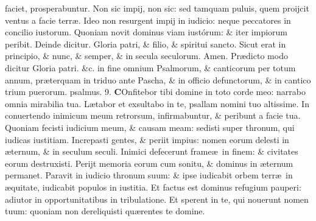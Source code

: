 \documentclass[a5paper,10pt]{book}
\def\ae{æ}
\begin{document}
\begin{multicols*}{2}
faciet, prosperabuntur.
\newline \color{red} N\color{black}on sic impij, non sic: sed tamquam puluis, quem proijcit ventus a facie terr\ae .
\newline \color{red} I\color{black}deo non resurgent impij in iudicio: neque peccatores in concilio iustorum.
\newline \color{red} Q\color{black}uoniam novit dominus viam iustórum: \& iter impiorum peribit.
\color{red} \quad Deinde dicitur. \color{black}
\newline \color{red} G\color{black}loria patri, \& filio, \& spiritui sancto.
\newline \color{red} S\color{black}icut erat in principio, \& nunc, \& semper, \& in secula seculorum. Amen. %
\newline
\color{red} Pr\ae dicto modo dicitur \color{black} Gloria patri. \color{red} \&c. in fine omnium Psalmorum, \& canticorum per totum annum, pr\ae terquam in triduo ante Pascha, \& in officio defunctorum, \& in cantico trium puerorum. \quad psalmus. 9. \color{black}
\lettrine[lines=2]{\bfseries \color{red} C}{}Onfitebor tibi domine in toto corde meo: narrabo omnia mirabilia tua.
\newline \color{red} L\color{black}\ae tabor et exsultabo in te, psallam nomini tuo altissime.
\newline \color{red} I\color{black}n conuertendo inimicum meum retrorsum, infirmabuntur, \& peribunt a facie tua.
\newline \color{red} Q\color{black}uoniam fecisti iudicium meum, \& causam meam: sedisti super thronum, qui iudicas iustitiam.
\newline \color{red} I\color{black}ncrepasti gentes, \& periit impius: nomen eorum delesti in \ae ternum, \& in seculum seculi.
\newline \color{red} I\color{black}nimici defecerunt frame\ae \ in finem: \& civitates eorum destruxisti.
\newline \color{red} P\color{black}erijt memoria eorum cum sonitu, \& dominus in \ae ternum permanet.
\newline \color{red} P\color{black}aravit in iudicio thronum suum: \& ipse iudicabit orbem terr\ae \ in \ae quitate, iudicabit populos in iustitia.
\newline \color{red} E\color{black}t factus est dominus refugium pauperi: adiutor in opportunitatibus in tribulatione.
\newline \color{red} E\color{black}t sperent in te, qui nouerunt nomen tuum: quoniam non dereliquisti qu\ae rentes te domine.

\end{multicols*}
\end{document}
